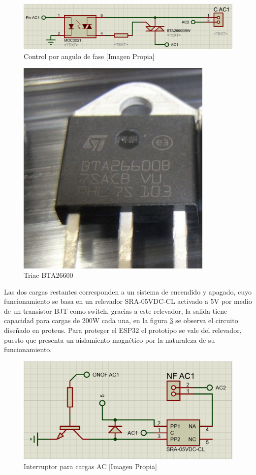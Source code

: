 		\begin{figure}[H]
			\centering
			\caption{Control por angulo de fase [Imagen Propia]}
			\label{fig:CAC1}
			\includegraphics[width=0.8\linewidth]{Imagenes/CAC1}
		\end{figure}
	
		\begin{figure}[H]
			\centering
			\caption{Triac BTA26600 \cite{TRIAC}}
			\label{fig:TRIAC}
			\includegraphics[width=0.35\linewidth]{Imagenes/TRIAC}
		\end{figure}
	
		Las dos cargas restantes corresponden a un sistema de encendido y apagado, cuyo funcionamiento se basa en un relevador SRA-05VDC-CL activado a 5V por medio de un transistor BJT como switch, gracias a este relevador, la salida tiene capacidad para cargas de 200W cada una, en la figura \ref{fig:ONOFAC} se observa el circuito diseñado en proteus. Para proteger el ESP32 el prototipo se vale del relevador, puesto que presenta un aislamiento magnético por la naturaleza de su funcionamiento.\\
	
		\begin{figure}[H]
			\centering
			\caption{Interruptor para cargas AC [Imagen Propia]}
			\label{fig:ONOFAC}
			\includegraphics[width=0.7\linewidth]{Imagenes/ONOFAC}
		\end{figure}
	
